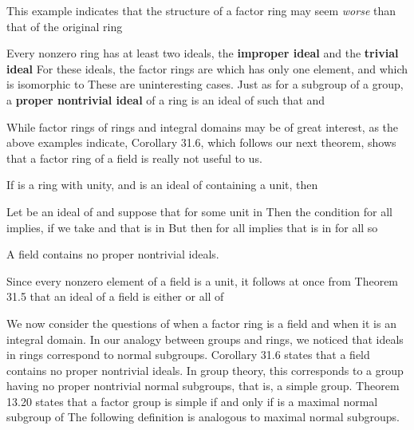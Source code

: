 \documentclass[11pt,oneside]{article}
\begin{document}
\begin{BookBody}

\noindent This example indicates that the structure of a factor ring may seem\textit{ worse} than that of the original ring\BookEnd{\blacktriangle}

Every nonzero ring  has at least two ideals, the\textbf{ improper ideal}  and the\textbf{ trivial} \textbf{ideal}  For these ideals, the factor rings are  which has only one element, and  which is isomorphic to  These are uninteresting cases. Just as for a subgroup of a group, a\textbf{ proper nontrivial ideal} of a ring  is an ideal  of  such that  and 

While factor rings of rings and integral domains may be of great interest, as the above examples indicate, Corollary 31.6, which follows our next theorem, shows that a factor ring of a field is really not useful to us.

 If  is a ring with unity, and  is an ideal of  containing a unit, then 

 Let  be an ideal of  and suppose that  for some unit  in  Then the condition  for all  implies, if we take  and  that  is in  But then  for all  implies that  is in  for all  so \BookEnd{\blacklozenge}

 A field contains no proper nontrivial ideals.

 Since every nonzero element of a field is a unit, it follows at once from Theorem 31.5 that an ideal of a field  is either  or all of \BookEnd{\blacklozenge}


\noindent We now consider the questions of when a factor ring is a field and when it is an integral domain. In our analogy between groups and rings, we noticed that ideals in rings correspond to normal subgroups. Corollary 31.6 states that a field contains no proper nontrivial ideals. In group theory, this corresponds to a group having no proper nontrivial normal subgroups, that is, a simple group. Theorem 13.20 states that a factor group  is simple if and only if  is a maximal normal subgroup of  The following definition is analogous to maximal normal subgroups.


\end{BookBody}
\end{document}
